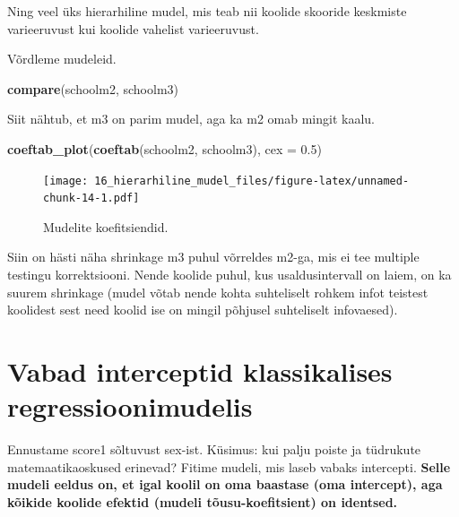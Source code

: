 \documentclass[]{book}
\newenvironment{Shaded}{\begin{snugshade}}{\end{snugshade}}
\newcommand{\KeywordTok}[1]{\textcolor[rgb]{0.13,0.29,0.53}{\textbf{#1}}}
\newcommand{\DataTypeTok}[1]{\textcolor[rgb]{0.13,0.29,0.53}{#1}}
\newcommand{\FloatTok}[1]{\textcolor[rgb]{0.00,0.00,0.81}{#1}}
\newcommand{\NormalTok}[1]{#1}
\begin{document}
Ning veel üks hierarhiline mudel, mis teab nii koolide skooride
keskmiste varieeruvust kui koolide vahelist varieeruvust.

Võrdleme mudeleid.

\begin{Shaded}
\begin{Highlighting}[]
\KeywordTok{compare}\NormalTok{(schoolm2, schoolm3)}
\end{Highlighting}
\end{Shaded}

Siit nähtub, et m3 on parim mudel, aga ka m2 omab mingit kaalu.

\begin{Shaded}
\begin{Highlighting}[]
\KeywordTok{coeftab_plot}\NormalTok{(}\KeywordTok{coeftab}\NormalTok{(schoolm2, schoolm3), }\DataTypeTok{cex =} \FloatTok{0.5}\NormalTok{)}
\end{Highlighting}
\end{Shaded}

\begin{figure}
\centering
\texttt{[image: 16\_hierarhiline\_mudel\_files/figure-latex/unnamed-chunk-14-1.pdf]}
\caption{\label{fig:unnamed-chunk-14}Mudelite koefitsiendid.}
\end{figure}

Siin on hästi näha shrinkage m3 puhul võrreldes m2-ga, mis ei tee
multiple testingu korrektsiooni. Nende koolide puhul, kus
usaldusintervall on laiem, on ka suurem shrinkage (mudel võtab nende
kohta suhteliselt rohkem infot teistest koolidest sest need koolid ise
on mingil põhjusel suhteliselt infovaesed).

\section{Vabad interceptid klassikalises
regressioonimudelis}\label{vabad-interceptid-klassikalises-regressioonimudelis}

Ennustame score1 sõltuvust sex-ist. Küsimus: kui palju poiste ja
tüdrukute matemaatikaoskused erinevad? Fitime mudeli, mis laseb vabaks
intercepti. \textbf{Selle mudeli eeldus on, et igal koolil on oma
baastase (oma intercept), aga kõikide koolide efektid (mudeli
tõusu-koefitsient) on identsed.}
\end{document}
